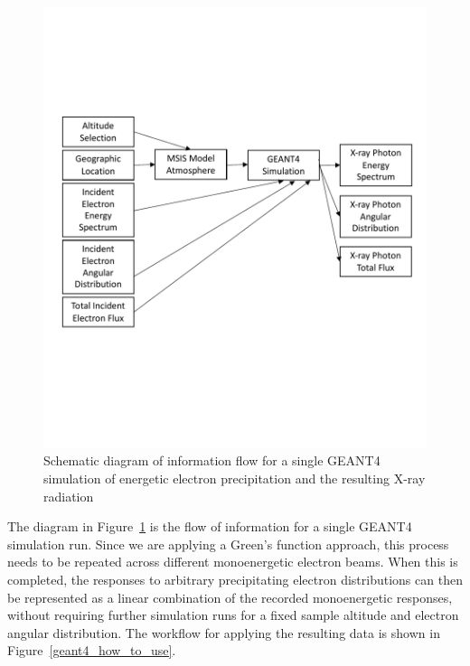 \begin{figure}[p]
\label{geant4_io_schematic}
\includegraphics[width=1.0\textwidth]{figures/chapter_3/geant4_io_schematic/geant4_io_schematic}
\caption{Schematic diagram of information flow for a single GEANT4 simulation of energetic electron precipitation and the resulting X-ray radiation}
\end{figure}

The diagram in Figure~\ref{geant4_io_schematic} is the flow of information for a single GEANT4 simulation run. Since we are applying a Green's function approach, this process needs to be repeated across different monoenergetic electron beams. When this is completed, the responses to arbitrary precipitating electron distributions can then be represented as a linear combination of the recorded monoenergetic responses, without requiring further simulation runs for a fixed sample altitude and electron angular distribution. The workflow for applying the resulting data is shown in Figure~\ref{geant4_how_to_use}.

